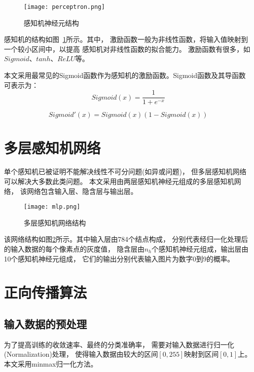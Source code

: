 \documentclass[forprint]{WHUBachelor}
\begin{document}
  \begin{figure}[ht]
    \centering
      \texttt{[image: perceptron.png]}
      \caption{感知机神经元结构}
      \label{fig:1}
  \end{figure}

  感知机的结构如图~\ref{fig:1}所示。其中，
  激励函数一般为非线性函数，将输入值映射到一个较小区间中，以提高
  感知机对非线性函数的拟合能力。
  激励函数有很多，如$Sigmoid$、$tanh$、$ReLU$等。

  本文采用最常见的Sigmoid函数作为感知机的激励函数。Sigmoid函数及其导函数可表示为：
  \begin{equation}
    Sigmoid(x)=\frac{1}{1+e^{-x}}
  \end{equation}

  \begin{equation}
    Sigmoid'(x)=Sigmoid(x)(1-Sigmoid(x))
  \end{equation}
  
  \section{多层感知机网络}

  单个感知机已被证明不能解决线性不可分问题(如异或问题)，
  但多层感知机网络可以解决大多数此类问题。
  本文采用由两层感知机神经元组成的多层感知机网络，
  该网络包含输入层、隐含层与输出层。

  \begin{figure}[ht]
    \centering
      \texttt{[image: mlp.png]}
      \caption{多层感知机网络结构}
      \label{fig:2}
  \end{figure}

  该网络结构如图\ref{fig:2}所示。其中输入层由784个结点构成，
  分别代表经归一化处理后的输入数据的每个像素点的灰度值，
  隐含层由$n_h$个感知机神经元组成，输出层由10个感知机神经元组成，
  它们的输出分别代表输入图片为数字0到9的概率。

  \section{正向传播算法}
    
    \subsection{输入数据的预处理}
    
      为了提高训练的收敛速率、最终的分类准确率，
      需要对输入数据进行归一化(Normalization)处理，
      使得输入数据由较大的区间$[0,255]$映射到区间$[0,1]$上。
      本文采用minmax归一化方法。
\end{document}
